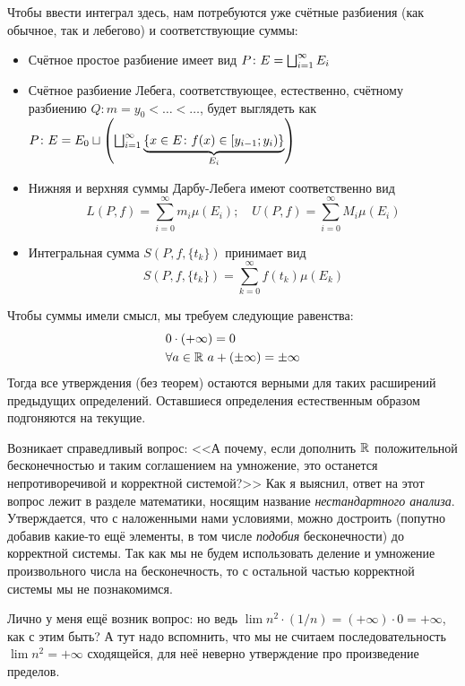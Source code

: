 \begin{note}
	Чтобы ввести интеграл здесь, нам потребуются уже счётные разбиения (как обычное, так и лебегово) и соответствующие суммы:
	\begin{itemize}
		\item Счётное простое разбиение имеет вид $P \colon E = \bigsqcup_{i = 1}^\infty E_i$
		
		\item Счётное разбиение Лебега, соответствующее, естественно, счётному разбиению $Q \colon m = y_0 < \ldots < \ldots$, будет выглядеть как $P \colon E = E_0 \sqcup \left(\bigsqcup_{i = 1}^\infty \underbrace{\{x \in E \colon f(x) \in \left[y_{i - 1}; y_i\right)\}}_{E_i}\right)$
		
		\item Нижняя и верхняя суммы Дарбу-Лебега имеют соответственно вид
		\[
			L(P, f) = \sum_{i = 0}^\infty m_i \mu(E_i); \quad U(P, f) = \sum_{i = 0}^\infty M_i \mu(E_i)
		\]
		
		\item Интегральная сумма $S(P, f, \{t_k\})$ принимает вид
		\[
			S(P, f, \{t_k\}) = \sum_{k = 0}^\infty f(t_k) \mu(E_k)
		\]
	\end{itemize}
\end{note}

\begin{note}
	Чтобы суммы имели смысл, мы требуем следующие равенства:
	\begin{align*}
		&{0 \cdot (+\infty) = 0}
		\\
		&{\forall a \in \mathbb{R}\ a + (\pm\infty) = \pm\infty}
	\end{align*}
	Тогда все утверждения (без теорем) остаются верными для таких расширений предыдущих определений. Оставшиеся определения естественным образом подгоняются на текущие.
\end{note}

\begin{anote}
	Возникает справедливый вопрос: <<А почему, если дополнить $\mathbb{R}$ положительной бесконечностью и таким соглашением на умножение, это останется непротиворечивой и корректной системой?>> Как я выяснил, ответ на этот вопрос лежит в разделе математики, носящим название \textit{нестандартного анализа}. Утверждается, что с наложенными нами условиями, можно достроить (попутно добавив какие-то ещё элементы, в том числе \textit{подобия} бесконечности) до корректной системы. Так как мы не будем использовать деление и умножение произвольного числа на бесконечность, то с остальной частью корректной системы мы не познакомимся.
	
	Лично у меня ещё возник вопрос: но ведь $\lim n^2 \cdot (1/n) = (+\infty) \cdot 0 = +\infty$, как с этим быть? А тут надо вспомнить, что мы не считаем последовательность $\lim n^2 = +\infty$ сходящейся, для неё неверно утверждение про произведение пределов.
\end{anote}

